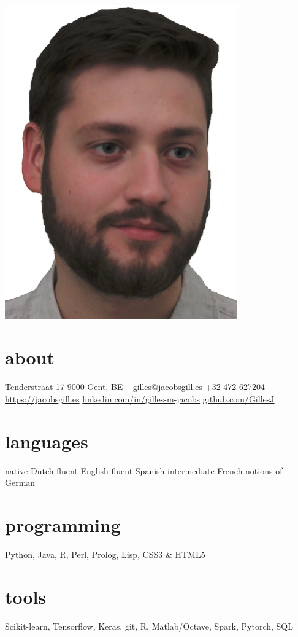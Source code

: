 \documentclass[]{friggeri-cv-a4}
\begin{document}

\begin{aside}
    \includegraphics[width=0.75\textwidth]{headshot.jpg}
    \section{about}
        Tenderstraat 17
        9000 Gent, BE
        ~
        \href{mailto:gilles@jacobsgill.es}{gilles@jacobsgill.es}
        \href{tel:+32472627204}{+32 472 627204}
        ~
        \href{https://jacobsgill.es}{https://jacobsgill.es}
        \href{https://www.linkedin.com/in/gilles-m-jacobs/}{{linkedin.com/in/gilles-m-jacobs}}
        \href{https://github.com/GillesJ}{github.com/GillesJ}
    \section{languages}
        native Dutch
        fluent English
        fluent Spanish
        intermediate French
        notions of German
    \section{programming}
        Python, Java, R, Perl, Prolog, Lisp, CSS3 \& HTML5
    \section{tools}
     Scikit-learn, Tensorflow, Keras, git, R, Matlab/Octave, Spark, Pytorch, SQL
\end{aside}
\end{document}

